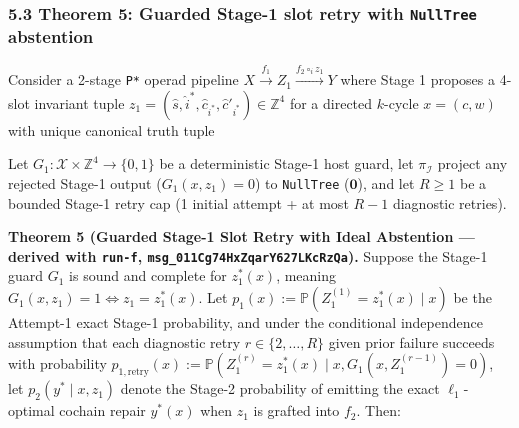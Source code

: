 \documentclass[
  11pt,
]{article}
\newcommand{\passthrough}[1]{#1}
\newcommand{\PfpDisplayMath}[1]{%
  \sbox{\PfpMathBox}{$\displaystyle #1$}%
  \ifdim\wd\PfpMathBox>\linewidth
    \resizebox{\linewidth}{!}{\usebox{\PfpMathBox}}%
  \else\usebox{\PfpMathBox}\fi}
\begin{document}
\subsubsection{\texorpdfstring{5.3 Theorem 5: Guarded Stage-1 slot retry
with \texttt{NullTree}
abstention}{5.3 Theorem 5: Guarded Stage-1 slot retry with NullTree abstention}}\label{theorem-5-guarded-stage-1-slot-retry-with-nulltree-abstention}

Consider a 2-stage \passthrough{\lstinline!P*!} operad pipeline
\(X \xrightarrow{f_1} Z_1 \xrightarrow{f_2 \circ_i z_1} Y\) where Stage
1 proposes a 4-slot invariant tuple
\(z_1 = (\hat{s},\allowbreak  \hat{i}^*,\allowbreak  \hat{c}_{i^*},\allowbreak  \hat{c}'_{i^*}) \in \mathbb{Z}^4\)
for a directed \(k\)-cycle \(x = (c,\allowbreak  w)\) with unique
canonical truth tuple
\begin{center}\PfpDisplayMath{z_1^*(x) = \left(s(c),\; i^*(w),\; c_{i^*},\; c_{i^*} - s(c)\right), \qquad i^*(w) := \min \arg\min_{0 \le j < k} w_j.}\end{center}
Let \(G_1: \mathcal{X} \times \mathbb{Z}^4 \to \{0,\allowbreak  1\}\) be
a deterministic Stage-1 host guard, let \(\pi_{\mathcal{I}}\) project
any rejected Stage-1 output (\(G_1(x,\allowbreak  z_1) = 0\)) to
\passthrough{\lstinline!NullTree!} (\(\mathbf{0}\)), and let \(R \ge 1\)
be a bounded Stage-1 retry cap (1 initial attempt + at most \(R - 1\)
diagnostic retries).

\textbf{Theorem 5 (Guarded Stage-1 Slot Retry with Ideal Abstention ---
derived with \nolinkurl{run-f},
\nolinkurl{msg_011Cg74HxZqarY627LKcRzQa}).} Suppose the Stage-1 guard
\(G_1\) is sound and complete for \(z_1^*(x)\), meaning
\(G_1(x,\allowbreak  z_1) = 1 \iff z_1 = z_1^*(x)\). Let
\(p_1(x) := \mathbb{P}(Z_1^{(1)} = z_1^*(x) \mid x)\) be the Attempt-1
exact Stage-1 probability, and under the conditional independence
assumption that each diagnostic retry
\(r \in \{2,\allowbreak  \dots,\allowbreak  R\}\) given prior failure
succeeds with probability
\(p_{1,\allowbreak \text{retry}}(x) := \mathbb{P}(Z_1^{(r)} = z_1^*(x) \mid x,\allowbreak  G_1(x,\allowbreak  Z_1^{(r-1)}) = 0)\),
let \(p_2(y^* \mid x,\allowbreak  z_1)\) denote the Stage-2 probability
of emitting the exact \(\ell_1\)-optimal cochain repair \(y^*(x)\) when
\(z_1\) is grafted into \(f_2\). Then:
\end{document}
